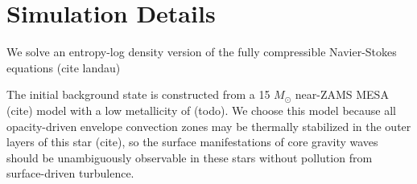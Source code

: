 \section{Simulation Details}
\label{sec:simulation_details}

We solve an entropy-log density version of the fully compressible Navier-Stokes equations (cite landau)
%
%
%

The initial background state is constructed from a 15 $M_{\odot}$ near-ZAMS MESA (cite) model with a low metallicity of (todo).
We choose this model because all opacity-driven envelope convection zones may be thermally stabilized in the outer layers of this star (cite), so the surface manifestations of core gravity waves should be unambiguously observable in these stars without pollution from surface-driven turbulence.
